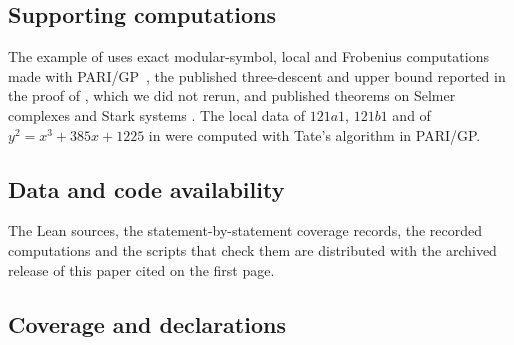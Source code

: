 \documentclass[11pt]{article}
\theoremstyle{definition}
\begin{document}
\subsection*{Supporting computations}

The example of  uses exact modular-symbol, local and
Frobenius computations made with PARI/GP~\citep{PARI2023}, the published
three-descent and upper bound reported in the proof of
\citet[Theorem~7.2]{Miller2011}, which we did not rerun, and published
theorems on Selmer complexes and Stark systems
\citep{Sakamoto2018,MaciasCastilloSano2026}.  The local data of $121a1$,
$121b1$ and of $y^2=x^3+385x+1225$ in  were
computed with Tate's algorithm in PARI/GP.

\subsection*{Data and code availability}

The Lean sources, the statement-by-statement coverage records, the
recorded computations and the scripts that check them are distributed
with the archived release of this paper cited on the first page.

\subsection*{Coverage and declarations}
\end{document}
